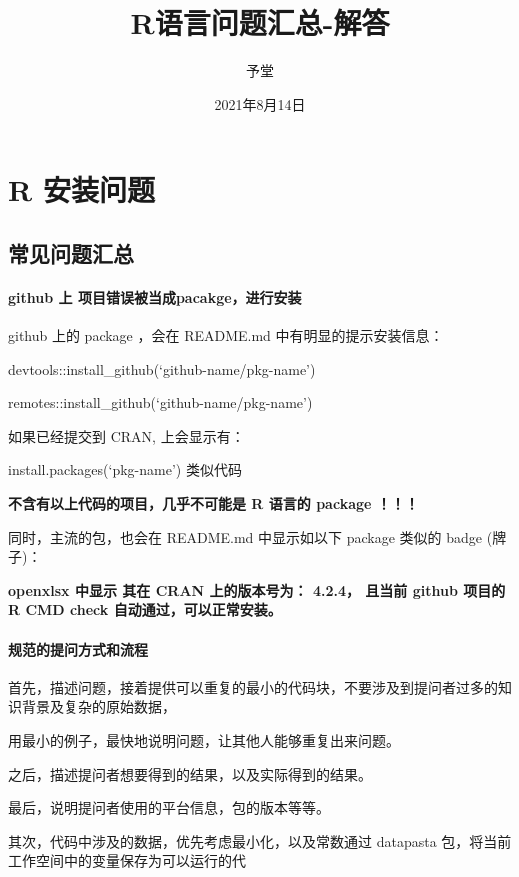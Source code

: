 \documentclass[
]{book}
\title{R语言问题汇总-解答}
\author{予堂}
\date{2021年8月14日}
\begin{document}
\maketitle

{
\setcounter{tocdepth}{1}
\tableofcontents
}
\hypertarget{part-r-ux5b89ux88c5ux95eeux9898}{%
\part{R 安装问题}\label{part-r-ux5b89ux88c5ux95eeux9898}}

\hypertarget{ux5e38ux89c1ux95eeux9898ux6c47ux603b}{%
\chapter{常见问题汇总}\label{ux5e38ux89c1ux95eeux9898ux6c47ux603b}}

\hypertarget{github-ux4e0a-ux9879ux76eeux9519ux8befux88abux5f53ux6210pacakgeux8fdbux884cux5b89ux88c5}{%
\subsection{github 上 项目错误被当成pacakge，进行安装}\label{github-ux4e0a-ux9879ux76eeux9519ux8befux88abux5f53ux6210pacakgeux8fdbux884cux5b89ux88c5}}

github 上的 package ，会在 README.md 中有明显的提示安装信息：

devtools::install\_github(`github-name/pkg-name')

remotes::install\_github(`github-name/pkg-name')

如果已经提交到 CRAN, 上会显示有：

install.packages(`pkg-name') 类似代码

\textbf{不含有以上代码的项目，几乎不可能是 R 语言的 package ！！！}

同时，主流的包，也会在 README.md 中显示如以下 package 类似的 badge (牌子)：

\textbf{openxlsx 中显示 其在 CRAN 上的版本号为： 4.2.4， 且当前 github 项目的 R CMD check 自动通过，可以正常安装。}

\hypertarget{ux89c4ux8303ux7684ux63d0ux95eeux65b9ux5f0fux548cux6d41ux7a0b}{%
\subsection{规范的提问方式和流程}\label{ux89c4ux8303ux7684ux63d0ux95eeux65b9ux5f0fux548cux6d41ux7a0b}}

首先，描述问题，接着提供可以重复的最小的代码块，不要涉及到提问者过多的知识背景及复杂的原始数据，

用最小的例子，最快地说明问题，让其他人能够重复出来问题。

之后，描述提问者想要得到的结果，以及实际得到的结果。

最后，说明提问者使用的平台信息，包的版本等等。

其次，代码中涉及的数据，优先考虑最小化，以及常数通过 datapasta 包，将当前工作空间中的变量保存为可以运行的代

\printbibliography
\end{document}
